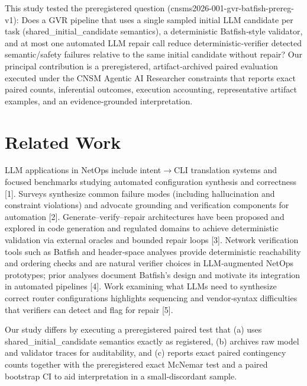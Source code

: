 \documentclass[conference]{IEEEtran}
\begin{document}
This study tested the preregistered question (cnsms2026-001-gvr-batfish-prereg-v1): Does a GVR pipeline that uses a single sampled initial LLM candidate per task (shared\_initial\_candidate semantics), a deterministic Batfish‑style validator, and at most one automated LLM repair call reduce deterministic‑verifier detected semantic/safety failures relative to the same initial candidate without repair? Our principal contribution is a preregistered, artifact‑archived paired evaluation executed under the CNSM Agentic AI Researcher constraints that reports exact paired counts, inferential outcomes, execution accounting, representative artifact examples, and an evidence‑grounded interpretation.

\section{Related Work}
LLM applications in NetOps include intent\ensuremath{\rightarrow}CLI translation systems and focused benchmarks studying automated configuration synthesis and correctness [1]. Surveys synthesize common failure modes (including hallucination and constraint violations) and advocate grounding and verification components for automation [2]. Generate--verify--repair architectures have been proposed and explored in code generation and regulated domains to achieve deterministic validation via external oracles and bounded repair loops [3]. Network verification tools such as Batfish and header‑space analyses provide deterministic reachability and ordering checks and are natural verifier choices in LLM‑augmented NetOps prototypes; prior analyses document Batfish's design and motivate its integration in automated pipelines [4]. Work examining what LLMs need to synthesize correct router configurations highlights sequencing and vendor‑syntax difficulties that verifiers can detect and flag for repair [5].

Our study differs by executing a preregistered paired test that (a) uses shared\_initial\_candidate semantics exactly as registered, (b) archives raw model and validator traces for auditability, and (c) reports exact paired contingency counts together with the preregistered exact McNemar test and a paired bootstrap CI to aid interpretation in a small‑discordant sample.
\end{document}
